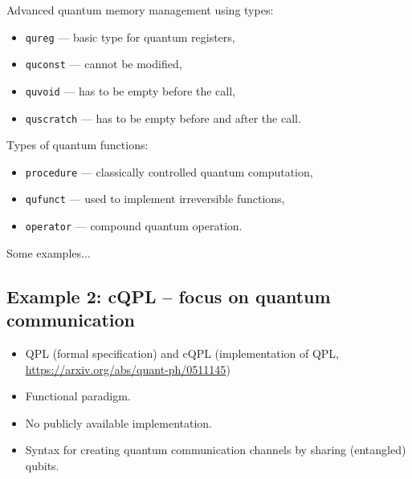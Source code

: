\documentclass[a4paper,11pt]{article}
\begin{document}

Advanced quantum memory management using types:
\begin{itemize}
\item \texttt{qureg} ---  basic type for quantum registers,
\item \texttt{quconst} --- cannot be modified,
\item \texttt{quvoid} --- has to be empty before the call,
\item \texttt{quscratch} --- has to be empty before and after the 
call.
\end{itemize}

Types of quantum functions:
\begin{itemize}
\item \texttt{procedure} ---  classically controlled quantum 
computation,
\item \texttt{qufunct} --- used to implement irreversible functions,
\item \texttt{operator} --- compound quantum operation.
\end{itemize}



Some examples...


\subsection{Example 2: cQPL -- focus on quantum communication}



\begin{itemize}
\item QPL (formal specification) and cQPL (implementation of QPL, 
\url{https://arxiv.org/abs/quant-ph/0511145})
\item Functional paradigm.
\item No publicly available implementation.
\item Syntax for creating quantum communication channels by sharing 
(entangled) qubits.
\end{itemize}

\end{document}
